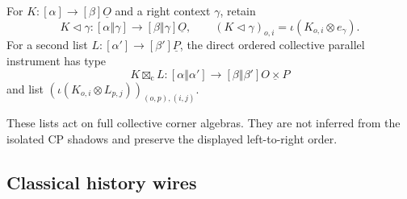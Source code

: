 \begin{definition}
For $K:[\alpha]\to[\beta]\underline O$ and a right context $\gamma$, retain
\[
 K\triangleleft\gamma:
 [\alpha\mathbin\Vert\gamma]
 \longrightarrow[\beta\mathbin\Vert\gamma]\underline O,
 \qquad
 (K\triangleleft\gamma)_{o,i}
   =\iota(K_{o,i}\otimes e_\gamma).
\]
For a second list $L:[\alpha']\to[\beta']\underline P$, the direct ordered
collective parallel instrument has type
\[
 K\boxtimes_{\mathrm c}L:
 [\alpha\mathbin\Vert\alpha']
 \longrightarrow[\beta\mathbin\Vert\beta']\underline{O\times P}
\]
and list $(\iota(K_{o,i}\otimes L_{p,j}))_{(o,p),(i,j)}$.
\end{definition}
\begin{scope}
These lists act on full collective corner algebras.  They are not inferred
from the isolated CP shadows and preserve the displayed left-to-right order.
\end{scope}

\subsection{Classical history wires}

